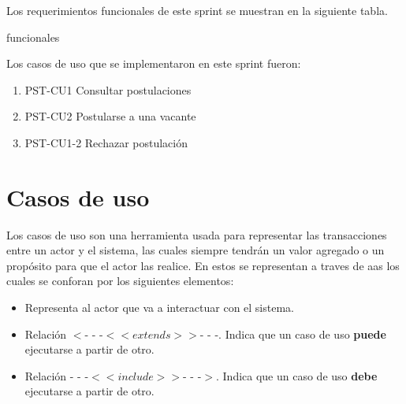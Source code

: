 Los requerimientos funcionales de este sprint se muestran en la siguiente tabla.
\begin{requerimientos}{funcionales}
        
\end{requerimientos}


Los casos de uso que se implementaron en este sprint fueron:
\begin{enumerate}
    \item PST-CU1 Consultar postulaciones
    \item PST-CU2 Postularse a una vacante
    \item PST-CU1-2 Rechazar postulación
\end{enumerate} 


\section{Casos de uso}


%
%
%

Los casos de uso son una herramienta usada para representar las transacciones entre un actor y el sistema, las cuales siempre tendrán un valor agregado o un propósito para que el actor las realice.
En estos se representan a traves de aas los cuales se conforan por los siguientes elementos:

\begin{itemize}
	 \UCpaso Representa al sistema mediante un óvalo.
	\item \UCactor Representa al actor que va a interactuar con el sistema.
	\item Relación $<$- - -$<<extends>>$- - -. Indica que un caso de uso \textbf{puede} ejecutarse a partir de otro.
	\item Relación - - -$<<include>>$- - -$>$. Indica que un caso de uso \textbf{debe} ejecutarse a partir de otro.
\end{itemize}

